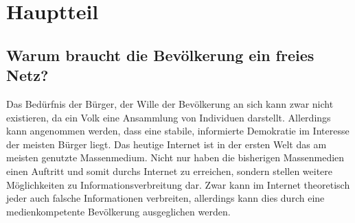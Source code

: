 \documentclass[
	12pt,
	a4paper,
	BCOR10mm,
	DIV14,
	listof=totoc,
	bibliography=totoc,
	headsepline
]{scrreprt}
\begin{document}

\chapter{Hauptteil}
\label{main}
\section{Warum braucht die Bevölkerung ein freies Netz?}
Das Bedürfnis der Bürger, der Wille der Bevölkerung an sich kann zwar nicht existieren, da ein Volk eine Ansammlung von Individuen darstellt.
Allerdings kann angenommen werden, dass eine stabile, informierte Demokratie im Interesse der meisten Bürger liegt. 
Das heutige Internet ist in der ersten Welt das am meisten genutzte Massenmedium.
Nicht nur haben die bisherigen Massenmedien einen Auftritt und somit durchs Internet zu erreichen, sondern stellen weitere Möglichkeiten zu Informationsverbreitung dar.
Zwar kann im Internet theoretisch jeder auch falsche Informationen verbreiten, allerdings kann dies durch eine medienkompetente Bevölkerung ausgeglichen werden.


\end{document}
